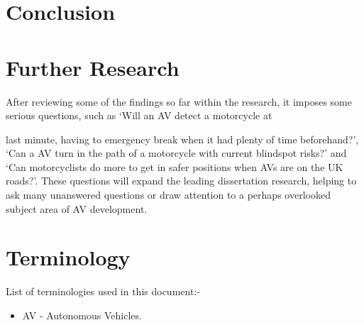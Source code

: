 \documentclass[conference]{IEEEtran}
\begin{document}
\section{Conclusion}

\section{Further Research}
	After reviewing some of the findings so far within the research, it imposes some serious questions, such as `Will an AV detect a motorcycle at
	
	last minute, having to emergency break when it had plenty of time beforehand?', `Can a AV turn in the path of a motorcycle with current blindspot risks?' and `Can motorcyclists do more to get in safer positions when AVs are on the UK roads?'. These questions will expand the leading dissertation research, helping to ask many unanswered questions or draw attention to a perhaps overlooked subject area of AV development.

\section{Terminology}
	List of terminologies used in this document:-
	\begin{itemize}
		\item AV - Autonomous Vehicles.
	\end{itemize}

\nocite{*}
\renewcommand\refname{\section{Reference List}}
\small{
	}
\end{document}
